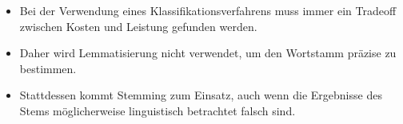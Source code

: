 \begin{frame}


\begin{itemize}
  \item Bei der Verwendung eines Klassifikationsverfahrens muss immer ein
  Tradeoff zwischen Kosten und Leistung gefunden werden.
  \item Daher wird Lemmatisierung nicht verwendet, um den Wortstamm präzise zu
  bestimmen.
  \item Stattdessen kommt Stemming zum Einsatz, auch wenn die Ergebnisse des
  Stems möglicherweise linguistisch betrachtet falsch sind.
\end{itemize}
\end{frame}
	
	